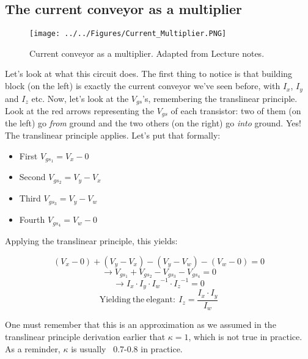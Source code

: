 \subsection{The current conveyor as a multiplier}

\begin{figure}[H]
    \centering
    \texttt{[image: ../../Figures/Current\_Multiplier.PNG]}
    \caption{Current conveyor as a multiplier. Adapted from Lecture notes.}
    \label{fig:Current_Multiplier}
\end{figure}

Let's look at what this circuit does. The first thing to notice is that building block (on the left) is exactly the current conveyor we've seen before, with $I_x$, $I_y$ and $I_z$ etc. Now, let's look at the $V_{gs}$'s, remembering the translinear principle. Look at the red arrows representing the $V_{gs}$ of each transistor: two of them (on the left) go \textit{from} ground and the two others (on the right) go \textit{into} ground. Yes! The translinear principle applies. Let's put that formally: 

\begin{itemize}
    \item First $V_{gs_1} = V_x - 0$
    \item Second $V_{gs_2} = V_y - V_x$
    \item Third $V_{gs_3} = V_y - V_w$
    \item Fourth $V_{gs_4} = V_w - 0$
\end{itemize}

Applying the translinear principle, this yields: 

\begin{equation}
    (V_x - 0) + (V_y - V_x) - (V_y - V_w) - (V_w - 0) = 0
\end{equation}
\begin{equation}
    \rightarrow V_{gs_1} + V_{gs_2} - V_{gs_3} - V_{gs_4} = 0
\end{equation}
\begin{equation}
    \rightarrow I_x \cdot I_y \cdot {I_w}^{-1} \cdot {I_z}^{-1}= 0
\end{equation}
\begin{equation}
    \mathrm{Yielding \ the \ elegant: }\ I_z = \frac{I_x \cdot I_y}{I_w} 
\end{equation}

One must remember that this is an approximation as we assumed in the translinear principle derivation earlier that $\kappa = 1$, which is not true in practice. As a reminder, $\kappa$ is usually ~0.7-0.8 in practice.  




